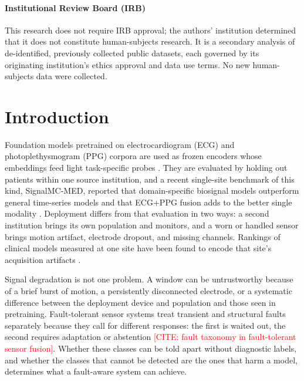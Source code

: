 \documentclass[pmlr,twocolumn,10pt]{jmlr}
\newif\iffinal
\newcommand{\placeholder}[1]{\textcolor{red}{[#1]}}
\begin{document}
\paragraph*{Institutional Review Board (IRB)}
This research does not require IRB approval; \iffinal Harvard Medical School\else the authors' institution\fi{} determined that it does not constitute human-subjects research. It is a secondary analysis of de-identified, previously collected public datasets, each governed by its originating institution's ethics approval and data use terms. No new human-subjects data were collected.
\fi

\section{Introduction}
\label{sec:intro}

Foundation models pretrained on electrocardiogram (ECG) and photoplethysmogram (PPG) corpora are used as frozen encoders whose embeddings feed light task-specific probes \citep{goswami2024moment,ansari2024chronos,li2024ecgfounder,pillai2024papagei}. They are evaluated by holding out patients within one source institution, and a recent single-site benchmark of this kind, SignalMC-MED, reported that domain-specific biosignal models outperform general time-series models and that ECG+PPG fusion adds to the better single modality \citep{signalmcmed}. Deployment differs from that evaluation in two ways: a second institution brings its own population and monitors, and a worn or handled sensor brings motion artifact, electrode dropout, and missing channels. Rankings of clinical models measured at one site have been found to encode that site's acquisition artifacts \citep{zech2018variable,finlayson2021clinician}.

Signal degradation is not one problem. A window can be untrustworthy because of a brief burst of motion, a persistently disconnected electrode, or a systematic difference between the deployment device and population and those seen in pretraining. Fault-tolerant sensor systems treat transient and structural faults separately because they call for different responses: the first is waited out, the second requires adaptation or abstention \placeholder{CITE: fault taxonomy in fault-tolerant sensor fusion}. Whether these classes can be told apart without diagnostic labels, and whether the classes that cannot be detected are the ones that harm a model, determines what a fault-aware system can achieve.
\end{document}
